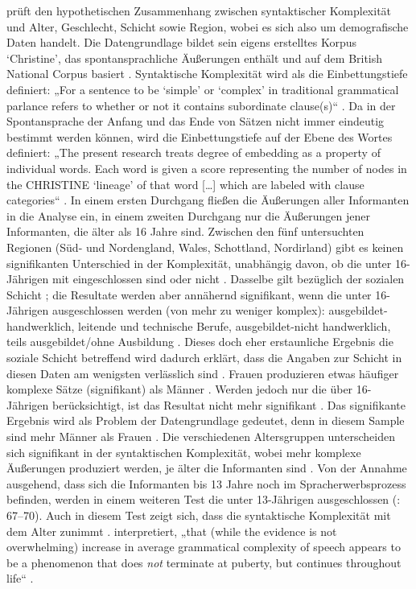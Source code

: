 \citet{Sampson2009} prüft den hypothetischen Zusammenhang zwischen syntaktischer Komplexität und Alter, Geschlecht, Schicht sowie Region, wobei es sich also um demografische Daten handelt. Die Datengrundlage bildet sein eigens erstelltes Korpus ‘Christine’, das spontansprachliche Äußerungen enthält und auf dem British National Corpus basiert \citep[57--58]{Sampson2009}. Syntaktische Komplexität wird als die Einbettungstiefe definiert: „For a sentence to be ‘simple’ or ‘complex’ in traditional grammatical parlance refers to whether or not it contains subordinate clause(s)“ \citep[58]{Sampson2009}. Da in der Spontansprache der Anfang und das Ende von Sätzen nicht immer eindeutig bestimmt werden können, wird die Einbettungstiefe auf der Ebene des Wortes definiert: „The present research treats degree of embedding as a property of individual words. Each word is given a score representing the number of nodes in the CHRISTINE ‘lineage’ of that word […] which are labeled with clause categories“ \citep[59]{Sampson2001}. In einem ersten Durchgang fließen die Äußerungen aller Informanten in die Analyse ein, in einem zweiten Durchgang nur die Äußerungen jener Informanten, die älter als 16 Jahre sind. Zwischen den fünf untersuchten Regionen (Süd- und Nordengland, Wales, Schottland, Nordirland) gibt es keinen signifikanten Unterschied in der Komplexität, unabhängig davon, ob die unter 16-Jährigen mit eingeschlossen sind oder nicht \citep[62, 64, 66]{Sampson2009}. Dasselbe gilt bezüglich der sozialen Schicht \citep[64]{Sampson2009}; die Resultate werden aber annähernd signifikant, wenn die unter 16-Jährigen ausgeschlossen werden (von mehr zu weniger komplex): ausgebildet-handwerklich, leitende und technische Berufe, ausgebildet-nicht handwerklich, teils ausgebildet/ohne Ausbildung \citep[67]{Sampson2009}. Dieses doch eher erstaunliche Ergebnis die soziale Schicht betreffend wird dadurch erklärt, dass die Angaben zur Schicht in diesen Daten am wenigsten verlässlich sind \citep[67]{Sampson2009}. Frauen produzieren etwas häufiger komplexe Sätze (signifikant) als Männer \citep[65]{Sampson2009}. Werden jedoch nur die über 16-Jährigen berücksichtigt, ist das Resultat nicht mehr signifikant \citep[66]{Sampson2009}. Das signifikante Ergebnis wird als Problem der Datengrundlage gedeutet, denn in diesem Sample sind mehr Männer als Frauen \citep[66--67]{Sampson2009}. Die verschiedenen Altersgruppen unterscheiden sich signifikant in der syntaktischen Komplexität, wobei mehr komplexe Äußerungen produziert werden, je älter die Informanten sind \citep[65]{Sampson2009}. Von der Annahme ausgehend, dass sich die Informanten bis 13 Jahre noch im Spracherwerbsprozess befinden, werden in einem weiteren Test die unter 13-Jährigen ausgeschlossen (\citealt{Sampson2009}: 67–70). Auch in diesem Test zeigt sich, dass die syntaktische Komplexität mit dem Alter zunimmt \citep[70]{Sampson2009}. \citet{Sampson2009} interpretiert, „that (while the evidence is not overwhelming) increase in average grammatical complexity of speech appears to be a phenomenon that does \textit{not} terminate at puberty, but continues throughout life“ \citep[70]{Sampson2009}.

